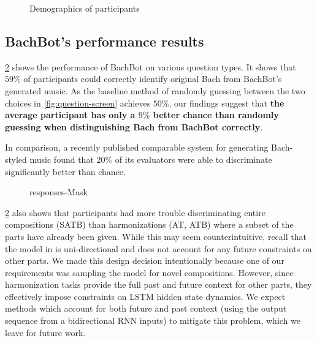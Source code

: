\begin{figure}[tb]
  \centering
  
  \caption{Demographics of participants}
  \label{fig:user-demographics}
\end{figure}

\subsection{BachBot's performance results}



\cref{fig:responses-mask} shows the performance of BachBot on various question
types. It shows that $59\%$ of participants could correctly
identify original Bach from BachBot's generated music. As the baseline method
of randomly guessing between the two choices in \cref{fig:question-screen}
achieves $50\%$, our findings suggest that {\bf the average participant has only a
$9\%$ better chance than randomly guessing when
distinguishing Bach from BachBot correctly}.

 In comparison, a recently
published comparable system for generating Bach-styled music found that
$20\%$ of its evaluators were able to discriminate significantly better than chance.

\begin{figure}[tb]
  \centering
  
  \caption{responses-Mask}
  \label{fig:responses-mask}
\end{figure}

\cref{fig:responses-mask} also shows that participants had more trouble
discriminating entire compositions (SATB) than harmonizations (AT, ATB) where a
subset of the parts have already been given. While this may seem
counterintuitive, recall that the model in  is uni-directional
and does not account for any future constraints on other parts. We made
this design decision intentionally because one of our requirements was sampling
the model for novel compositions. However, since harmonization tasks provide
the full past and future context for other parts, they effectively impose constraints
on LSTM hidden state dynamics. We expect methods which account for both future and past
context (\eg using the output sequence from a bidirectional RNN inputs)
to mitigate this problem, which we leave for future work.

